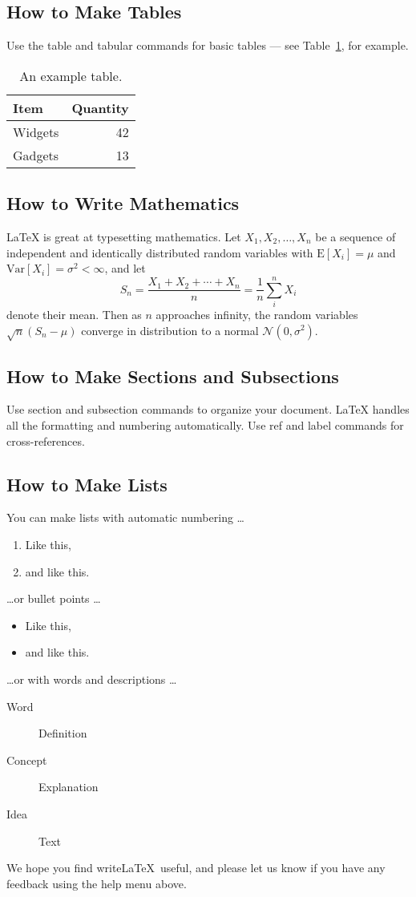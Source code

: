 \documentclass[a4paper]{article}
\begin{document}
\subsection{How to Make Tables}

Use the table and tabular commands for basic tables --- see Table~\ref{tab:widgets}, for example.

\begin{table}
\centering
\begin{tabular}{l|r}
Item & Quantity \\\hline
Widgets & 42 \\
Gadgets & 13
\end{tabular}
\caption{\label{tab:widgets}An example table.}
\end{table}

\subsection{How to Write Mathematics}

\LaTeX{} is great at typesetting mathematics. Let $X_1, X_2, \ldots, X_n$ be a sequence of independent and identically distributed random variables with $\text{E}[X_i] = \mu$ and $\text{Var}[X_i] = \sigma^2 < \infty$, and let
$$S_n = \frac{X_1 + X_2 + \cdots + X_n}{n}
      = \frac{1}{n}\sum_{i}^{n} X_i$$
denote their mean. Then as $n$ approaches infinity, the random variables $\sqrt{n}(S_n - \mu)$ converge in distribution to a normal $\mathcal{N}(0, \sigma^2)$.

\subsection{How to Make Sections and Subsections}

Use section and subsection commands to organize your document. \LaTeX{} handles all the formatting and numbering automatically. Use ref and label commands for cross-references.

\subsection{How to Make Lists}

You can make lists with automatic numbering \dots

\begin{enumerate}
\item Like this,
\item and like this.
\end{enumerate}
\dots or bullet points \dots
\begin{itemize}
\item Like this,
\item and like this.
\end{itemize}
\dots or with words and descriptions \dots
\begin{description}
\item[Word] Definition
\item[Concept] Explanation
\item[Idea] Text
\end{description}

We hope you find write\LaTeX\ useful, and please let us know if you have any feedback using the help menu above.
\end{document}
